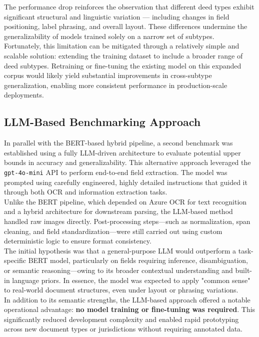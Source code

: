 \documentclass{article}
\begin{document}
The performance drop reinforces the observation that different deed types exhibit significant structural and linguistic variation — including changes in field positioning, label phrasing, and overall layout. These differences undermine the generalizability of models trained solely on a narrow set of subtypes. \\

Fortunately, this limitation can be mitigated through a relatively simple and scalable solution: extending the training dataset to include a broader range of deed subtypes. Retraining or fine-tuning the existing model on this expanded corpus would likely yield substantial improvements in cross-subtype generalization, enabling more consistent performance in production-scale deployments.

\subsection{LLM-Based Benchmarking Approach}

In parallel with the BERT-based hybrid pipeline, a second benchmark was established using a fully LLM-driven architecture to evaluate potential upper bounds in accuracy and generalizability. This alternative approach leveraged the \texttt{gpt-4o-mini} API to perform end-to-end field extraction. The model was prompted using carefully engineered, highly detailed instructions that guided it through both OCR and information extraction tasks. \\

Unlike the BERT pipeline, which depended on Azure OCR for text recognition and a hybrid architecture for downstream parsing, the LLM-based method handled raw images directly. Post-processing steps—such as normalization, span cleaning, and field standardization—were still carried out using custom deterministic logic to ensure format consistency. \\

The initial hypothesis was that a general-purpose LLM would outperform a task-specific BERT model, particularly on fields requiring inference, disambiguation, or semantic reasoning—owing to its broader contextual understanding and built-in language priors. In essence, the model was expected to apply "common sense" to real-world document structures, even under layout or phrasing variations. \\

In addition to its semantic strengths, the LLM-based approach offered a notable operational advantage: \textbf{no model training or fine-tuning was required}. This significantly reduced development complexity and enabled rapid prototyping across new document types or jurisdictions without requiring annotated data. \\
\end{document}
